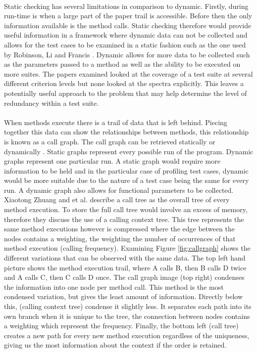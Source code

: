 \paragraph{}
Static checking has several limitations in comparison to dynamic. Firstly, during run-time is when a large part of the paper trail is accessible. Before then the only information available is the method calls.  Static checking therefore would provide useful information in a framework where dynamic data can not be collected and allows for the test cases to be examined in a static fashion such as the one used by Robinson, Li and Francis \cite{li2008static}. Dynamic allows for more data to be collected such as the parameters passed to a method as well as the ability to be executed on more suites. The papers examined looked at the coverage of a test suite at several different criterion levels but none looked at the spectra explicitly. This leaves a potentially useful approach to the problem that may help determine the level of redundancy within a test suite. 
\paragraph{}
When methods execute there is a trail of data that is left behind. Piecing together this data can show the relationships between methods, this relationship is known as a call graph. The call graph can be retrieved statically or dynamically \cite{graham1982gprof}. Static graphs represent every possible run of the program. Dynamic graphs represent one particular run. A static graph would require more information to be held and in the particular case of profiling test cases, dynamic would be more suitable due to the nature of a test case being the same for every run. A dynamic graph also allows for functional parameters to be collected. Xiaotong Zhuang and et al. \cite{Zhuang06accurate} describe a call tree as the overall tree of every method execution. To store the full call tree would involve an excess of memory, therefore they discuss the use of a calling context tree. This tree represents the same method executions however is compressed where the edge between the nodes contains a weighting, the weighting the number of occurrences of that method execution (calling frequency). Examining Figure \ref{fig:callgraph} shows the different variations that can be observed with the same data. The top left hand picture shows the method execution trail, where A calls B, then B calls D twice and A calls C, then C calls D once. The call graph image (top right) condenses the information into one node per method call. This method is the most condensed variation, but gives the least amount of information. Directly below this, (calling context tree) condense it slightly less. It separates each path into its own branch when it is unique to the tree, the connection between nodes contains a weighting which represent the frequency. Finally, the bottom left (call tree) creates a new path for every new method execution regardless of the uniqueness, giving us the most information about the context if the order is retained.

